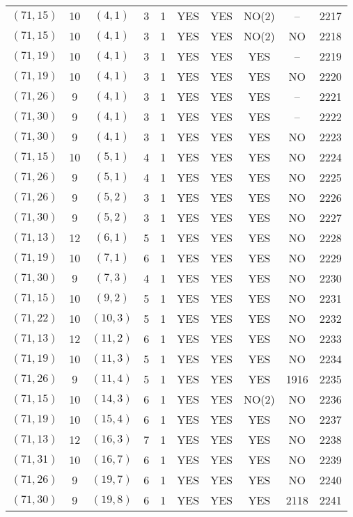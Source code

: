 \begin{longtable}{|c|c|c|c|c|c|c|c|c|c|}
$(71, 15)$ & 10 & $(4, 1)$ & 3 & 1 & YES & YES & NO(2) & -- & 2217\\
$(71, 15)$ & 10 & $(4, 1)$ & 3 & 1 & YES & YES & NO(2) & NO & 2218\\
$(71, 19)$ & 10 & $(4, 1)$ & 3 & 1 & YES & YES & YES & -- & 2219\\
$(71, 19)$ & 10 & $(4, 1)$ & 3 & 1 & YES & YES & YES & NO & 2220\\
$(71, 26)$ & 9 & $(4, 1)$ & 3 & 1 & YES & YES & YES & -- & 2221\\
$(71, 30)$ & 9 & $(4, 1)$ & 3 & 1 & YES & YES & YES & -- & 2222\\
$(71, 30)$ & 9 & $(4, 1)$ & 3 & 1 & YES & YES & YES & NO & 2223\\
$(71, 15)$ & 10 & $(5, 1)$ & 4 & 1 & YES & YES & YES & NO & 2224\\
$(71, 26)$ & 9 & $(5, 1)$ & 4 & 1 & YES & YES & YES & NO & 2225\\
$(71, 26)$ & 9 & $(5, 2)$ & 3 & 1 & YES & YES & YES & NO & 2226\\
$(71, 30)$ & 9 & $(5, 2)$ & 3 & 1 & YES & YES & YES & NO & 2227\\
$(71, 13)$ & 12 & $(6, 1)$ & 5 & 1 & YES & YES & YES & NO & 2228\\
$(71, 19)$ & 10 & $(7, 1)$ & 6 & 1 & YES & YES & YES & NO & 2229\\
$(71, 30)$ & 9 & $(7, 3)$ & 4 & 1 & YES & YES & YES & NO & 2230\\
$(71, 15)$ & 10 & $(9, 2)$ & 5 & 1 & YES & YES & YES & NO & 2231\\
$(71, 22)$ & 10 & $(10, 3)$ & 5 & 1 & YES & YES & YES & NO & 2232\\
$(71, 13)$ & 12 & $(11, 2)$ & 6 & 1 & YES & YES & YES & NO & 2233\\
$(71, 19)$ & 10 & $(11, 3)$ & 5 & 1 & YES & YES & YES & NO & 2234\\
$(71, 26)$ & 9 & $(11, 4)$ & 5 & 1 & YES & YES & YES & 1916 & 2235\\
$(71, 15)$ & 10 & $(14, 3)$ & 6 & 1 & YES & YES & NO(2) & NO & 2236\\
$(71, 19)$ & 10 & $(15, 4)$ & 6 & 1 & YES & YES & YES & NO & 2237\\
$(71, 13)$ & 12 & $(16, 3)$ & 7 & 1 & YES & YES & YES & NO & 2238\\
$(71, 31)$ & 10 & $(16, 7)$ & 6 & 1 & YES & YES & YES & NO & 2239\\
$(71, 26)$ & 9 & $(19, 7)$ & 6 & 1 & YES & YES & YES & NO & 2240\\
$(71, 30)$ & 9 & $(19, 8)$ & 6 & 1 & YES & YES & YES & 2118 & 2241\\

\end{longtable}
